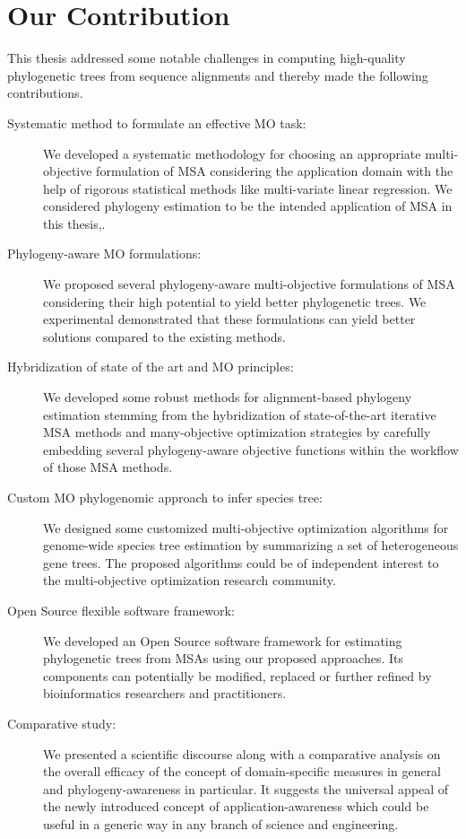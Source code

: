 \section{Our Contribution}
This thesis addressed some notable challenges in computing high-quality phylogenetic trees from sequence alignments and thereby made the following contributions.
\begin{description}

\item [Systematic method to formulate an effective MO task:]
 We developed a systematic methodology for choosing an appropriate multi-objective formulation of MSA considering the application domain with the help of rigorous statistical methods like multi-variate linear regression. We considered phylogeny estimation to be the intended application of MSA in this thesis,.

\item [Phylogeny-aware MO formulations:]
 We proposed several phylogeny-aware multi-objective formulations of MSA considering their high potential to yield better phylogenetic trees. We experimental demonstrated that these formulations can yield better solutions compared to the existing methods.

\item [Hybridization of state of the art and MO principles:]
 We developed some robust methods for alignment-based phylogeny estimation stemming from the hybridization of state-of-the-art iterative MSA methods and many-objective optimization strategies by carefully embedding several phylogeny-aware objective functions within the workflow of those MSA methods.

\item [Custom MO phylogenomic approach to infer species tree:]
 We designed some customized multi-objective optimization algorithms for genome-wide species tree estimation by summarizing a set of heterogeneous gene trees. The proposed algorithms could be of independent interest to the multi-objective optimization research community.

\item [Open Source flexible software framework:]
 We developed an Open Source software framework for estimating phylogenetic trees from MSAs using our proposed approaches. Its components can potentially be modified, replaced or further refined by bioinformatics researchers and practitioners.

\item [Comparative study:]
 We presented a scientific discourse along with a comparative analysis on the overall efficacy of the concept of domain-specific measures in general and phylogeny-awareness in particular. It suggests the universal appeal of the newly introduced concept of application-awareness which could be useful in a generic way in any branch of science and engineering.

\end{description}


